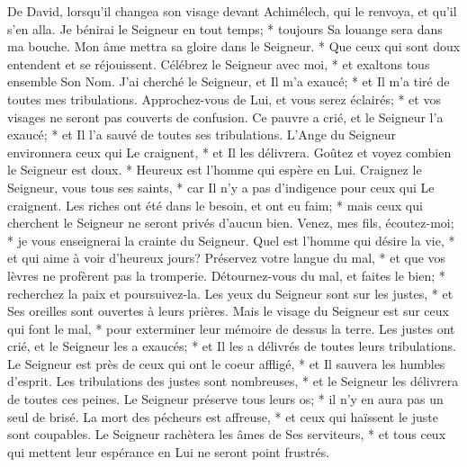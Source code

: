 De David, lorsqu'il changea son visage devant Achimélech, qui le renvoya, et qu'il s'en alla.
Je bénirai le Seigneur en tout temps; * toujours Sa louange sera dans ma bouche.
Mon âme mettra sa gloire dans le Seigneur. * Que ceux qui sont doux entendent et se réjouissent.
Célébrez le Seigneur avec moi, * et exaltons tous ensemble Son Nom.
J'ai cherché le Seigneur, et Il m'a exaucé; * et Il m'a tiré de toutes mes tribulations.
Approchez-vous de Lui, et vous serez éclairés; * et vos visages ne seront pas couverts de confusion.
Ce pauvre a crié, et le Seigneur l'a exaucé; * et Il l'a sauvé de toutes ses tribulations.
L'Ange du Seigneur environnera ceux qui Le craignent, * et Il les délivrera.
Goûtez et voyez combien le Seigneur est doux. * Heureux est l'homme qui espère en Lui.
Craignez le Seigneur, vous tous ses saints, * car Il n'y a pas d'indigence pour ceux qui Le craignent.
Les riches ont été dans le besoin, et ont eu faim; * mais ceux qui cherchent le Seigneur ne seront privés d'aucun bien.
Venez, mes fils, écoutez-moi; * je vous enseignerai la crainte du Seigneur.
Quel est l'homme qui désire la vie, * et qui aime à voir d'heureux jours?
Préservez votre langue du mal, * et que vos lèvres ne profèrent pas la tromperie.
Détournez-vous du mal, et faites le bien; * recherchez la paix et poursuivez-la.
Les yeux du Seigneur sont sur les justes, * et Ses oreilles sont ouvertes à leurs prières.
Mais le visage du Seigneur est sur ceux qui font le mal, * pour exterminer leur mémoire de dessus la terre.
Les justes ont crié, et le Seigneur les a exaucés; * et Il les a délivrés de toutes leurs tribulations.
Le Seigneur est près de ceux qui ont le coeur affligé, * et Il sauvera les humbles d'esprit.
Les tribulations des justes sont nombreuses, * et le Seigneur les délivrera de toutes ces peines.
Le Seigneur préserve tous leurs os; * il n'y en aura pas un seul de brisé.
La mort des pécheurs est affreuse, * et ceux qui haïssent le juste sont coupables.
Le Seigneur rachètera les âmes de Ses serviteurs, * et tous ceux qui mettent leur espérance en Lui ne seront point frustrés.

